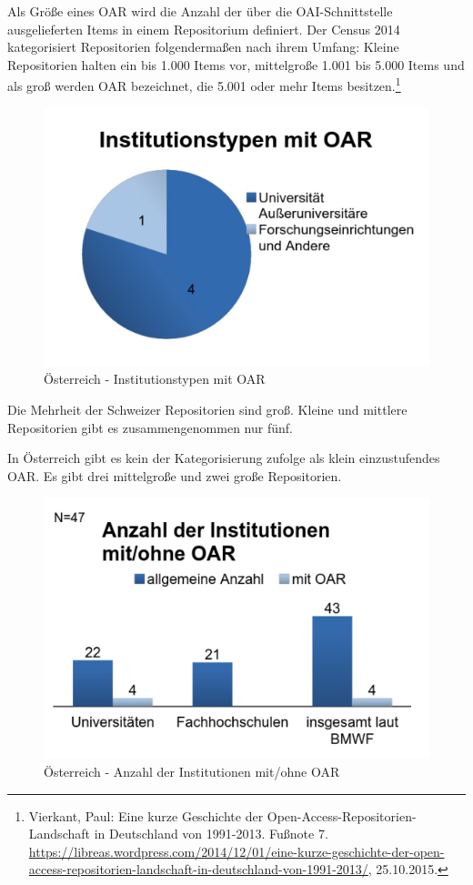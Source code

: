 \documentclass[a4paper,
fontsize=11pt,
oneside,
numbers=noperiodatend,
parskip=half-,
bibliography=totoc,
final
]{scrartcl}
\begin{document}
Als Größe eines OAR wird die Anzahl der über die OAI-Schnittstelle
ausgelieferten Items in einem Repositorium definiert. Der Census 2014
kategorisiert Repositorien folgendermaßen nach ihrem Umfang: Kleine
Repositorien halten ein bis 1.000 Items vor, mittelgroße 1.001 bis 5.000
Items und als groß werden OAR bezeichnet, die 5.001 oder mehr Items
besitzen.\footnote{Vierkant, Paul: Eine kurze Geschichte der
  Open-Access-Repositorien-Landschaft in Deutschland von 1991-2013.
  Fußnote 7.
  \url{https://libreas.wordpress.com/2014/12/01/eine-kurze-geschichte-der-open-access-repositorien-landschaft-in-deutschland-von-1991-2013/},
  25.10.2015.}

\begin{figure}[htbp]
\centering
\includegraphics{img/abb4_institutionentypen_oar.jpg}
\caption{Österreich - Institutionstypen mit OAR}
\end{figure}

Die Mehrheit der Schweizer Repositorien sind groß. Kleine und mittlere
Repositorien gibt es zusammengenommen nur fünf.

In Österreich gibt es kein der Kategorisierung zufolge als klein
einzustufendes OAR. Es gibt drei mittelgroße und zwei große
Repositorien.

\begin{figure}[htbp]
\centering
\includegraphics{img/abb5_institutionen_oar_at.jpg}
\caption{Österreich - Anzahl der Institutionen mit/ohne
OAR}
\end{figure}
\end{document}
